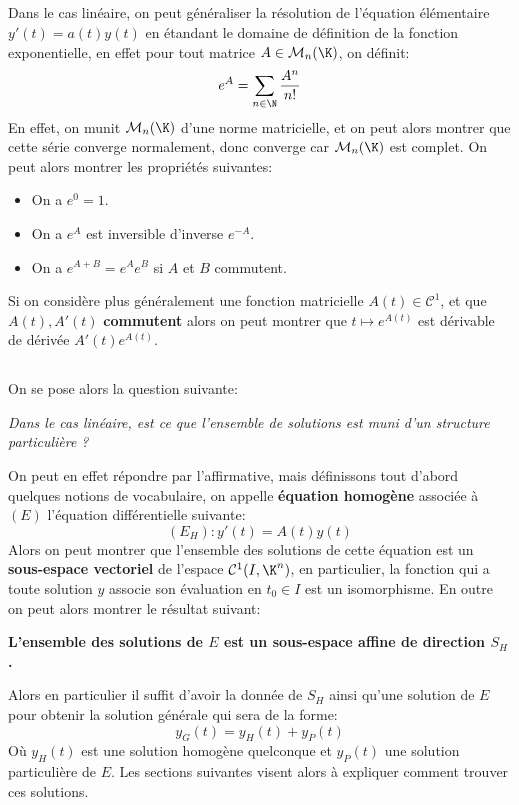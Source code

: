 \subsection*{}
Dans le cas linéaire, on peut généraliser la résolution de l'équation élémentaire \( y'(t) = a(t)y(t) \) en étandant le domaine de définition de la fonction exponentielle, en effet pour tout matrice \( A \in \mathcal{M}_n(\K) \), on définit:
\[ 
   e^A = \sum_{n \in \N} \frac{A^n}{n!} 
\]
En effet, on munit \( \mathcal{M}_n(\K) \) d'une norme matricielle, et on peut alors montrer que cette série converge normalement, donc converge car \( \mathcal{M}_n(\K) \) est complet. On peut alors montrer les propriétés suivantes:
\begin{itemize}
   \item On a \( e^0 = 1\).
   \item On a \( e^A \) est inversible d'inverse \( e^{-A} \).
   \item On a \( e^{A+B} = e^Ae^B \) si \( A \) et \( B \) commutent.
\end{itemize}
Si on considère plus généralement une fonction matricielle \( A(t) \in \mathcal{C}^1\), et que \( A(t), A'(t) \) \textbf{commutent} alors on peut montrer que \(t \mapsto e^{A(t)} \) est dérivable de dérivée \( A'(t)e^{A(t)} \).
\subsection*{}
On se pose alors la question suivante:
\begin{center}
   \textit{Dans le cas linéaire, est ce que l'ensemble de solutions est muni d'un structure particulière ?}
\end{center}
On peut en effet répondre par l'affirmative, mais définissons tout d'abord quelques notions de vocabulaire, on appelle \textbf{équation homogène} associée à \( (E) \) l'équation différentielle suivante:
\[ 
   (E_H): y'(t) = A(t)y(t) 
\]
Alors on peut montrer que l'ensemble des solutions de cette équation est un \textbf{sous-espace vectoriel} de l'espace \( \mathcal{C}^1(I, \K^n) \), en particulier, la fonction qui a toute solution \( y \) associe son évaluation en \( t_0 \in I \) est un isomorphisme. En outre on peut alors montrer le résultat suivant:
\begin{center}
   \textbf{L'ensemble des solutions de \( E \) est un sous-espace affine de direction \( S_H \).}
\end{center}
Alors en particulier il suffit d'avoir la donnée de \( S_H \) ainsi qu'une solution de \( E \) pour obtenir la solution générale qui sera de la forme:
\[ 
   y_G(t) = y_H(t) + y_P(t) 
\]
Où \( y_H(t) \) est une solution homogène quelconque et \( y_P(t) \) une solution particulière de \( E \). Les sections suivantes visent alors à expliquer comment trouver ces solutions.
